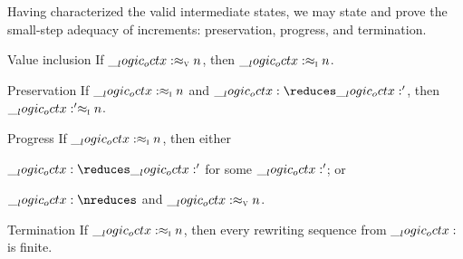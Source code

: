 Having characterized the valid intermediate states, we may state and prove the small-step adequacy of increments: preservation, progress, and termination.
%
\begin{theorem}%
  \leavevmode
  \begin{thmdescription}[nosep]
  \item[Value inclusion]
    If $\__logic_octx: \approx\sb{\text{\normalfont\scshape v}} n$, then $\__logic_octx: \approx\sb{\text{\normalfont\scshape i}} n$.
  \item[Preservation]
    If $\__logic_octx: \approx\sb{\text{\normalfont\scshape i}} n$ and $\octx \reduces \octx'$, then $\__logic_octx:' \approx\sb{\text{\normalfont\scshape i}} n$.
  \item[Progress]
    If $\__logic_octx: \approx\sb{\text{\normalfont\scshape i}} n$, then either
    \begin{itemize*}[
      mode=unboxed, label=, afterlabel=,
      before=\unskip:\space,
      itemjoin=;\space, itemjoin*=; or\space%
    ]
    \item $\octx \reduces \octx'$ for some $\__logic_octx:'$; or
    \item $\octx \nreduces$ and $\__logic_octx: \approx\sb{\text{\normalfont\scshape v}} n$.
    \end{itemize*}
  \item[Termination]
    If $\__logic_octx: \approx\sb{\text{\normalfont\scshape i}} n$, then every rewriting sequence from $\__logic_octx:$ is finite.
  \end{thmdescription}
\end{theorem}
%
